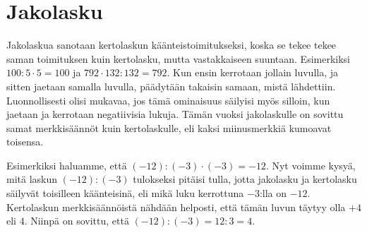 \section{Jakolasku}

    Jakolaskua sanotaan kertolaskun käänteistoimitukseksi, koska se tekee tekee
    saman toimituksen kuin kertolasku, mutta vastakkaiseen suuntaan. Esimerkiksi
    $100:5\cdot 5=100$ ja $792\cdot 132:132=792$. Kun ensin kerrotaan jollain
    luvulla, ja sitten jaetaan samalla luvulla, päädytään takaisin samaan, mistä 
    lähdettiin. Luonnollisesti olisi mukavaa, jos tämä ominaisuus säilyisi myös
    silloin, kun jaetaan ja kerrotaan negatiivisia lukuja. Tämän vuoksi jakolaskulle
    on sovittu samat merkkisäännöt kuin kertolaskulle, eli kaksi miinusmerkkiä
    kumoavat toisensa.
    
    Esimerkiksi haluamme, että $(-12):(-3)\cdot (-3)=-12$. Nyt voimme kysyä, mitä
    laskun $(-12):(-3)$ tulokseksi pitäisi tulla, jotta jakolasku ja kertolasku
    säilyvät toisilleen käänteisinä, eli mikä luku kerrottuna $-3$:lla on $-12$.
    Kertolaskun merkkisäännöistä nähdään helposti, että tämän luvun täytyy olla
    $+4$ eli $4$. Niinpä on sovittu, että $(-12):(-3)=12:3=4$.
    
